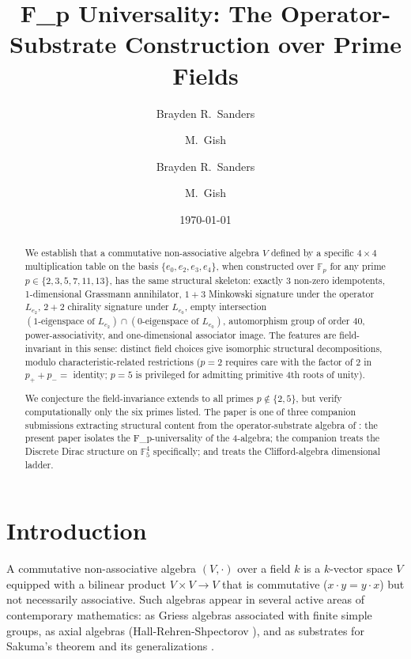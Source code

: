 \documentclass[11pt,reqno]{amsart}
\title[F_p Universality of a 4-Algebra]
{F_p Universality: The Operator-Substrate Construction over Prime Fields}
\author{Brayden R.\ Sanders \and M.\ Gish}
\author{Brayden R.\ Sanders \and M.\ Gish}
\date{\today}
\theoremstyle{plain}
\theoremstyle{definition}
\theoremstyle{remark}
\newcommand{\F}{\mathbb{F}}
\begin{document}
\begin{abstract}
We establish that a commutative non-associative algebra $V$ defined by a
specific $4 \times 4$ multiplication table on the basis
$\{e_0, e_2, e_3, e_4\}$, when constructed over $\F_p$ for any prime
$p \in \{2, 3, 5, 7, 11, 13\}$, has the same structural skeleton:
exactly 3 non-zero idempotents, 1-dimensional Grassmann annihilator,
$1{+}3$ Minkowski signature under the operator $L_{e_2}$, $2{+}2$ chirality
signature under $L_{e_0}$, empty intersection
$(\text{1-eigenspace of } L_{e_2}) \cap (\text{0-eigenspace of } L_{e_0})$,
automorphism group of order $40$, power-associativity, and
one-dimensional associator image. The features are field-invariant in
this sense: distinct field choices give isomorphic structural
decompositions, modulo characteristic-related restrictions ($p=2$
requires care with the factor of $2$ in $p_+ + p_- = $ identity; $p=5$
is privileged for admitting primitive 4th roots of unity).

We conjecture the field-invariance extends to all primes $p \notin
\{2,5\}$, but verify computationally only the six primes listed.
The paper is one of three companion submissions extracting structural
content from the operator-substrate algebra of \cite{SandersGishFourCore}:
the present paper isolates the F_p-universality of the 4-algebra; the
companion \cite{SandersGishDiscreteDirac} treats the Discrete Dirac
structure on $\F_5^4$ specifically; and \cite{SandersGishCliffordLadder}
treats the Clifford-algebra dimensional ladder.
\end{abstract}

\maketitle

\tableofcontents

\section{Introduction}

A commutative non-associative algebra $(V, \cdot)$ over a field $k$ is
a $k$-vector space $V$ equipped with a bilinear product
$V \times V \to V$ that is commutative ($x \cdot y = y \cdot x$) but
not necessarily associative. Such algebras appear in several active
areas of contemporary mathematics: as Griess algebras associated with
finite simple groups, as axial algebras
(Hall-Rehren-Shpectorov \cite{HallRehrenShpectorov2015}), and as
substrates for Sakuma's theorem and its generalizations \cite{Sakuma2007}.
\end{document}
